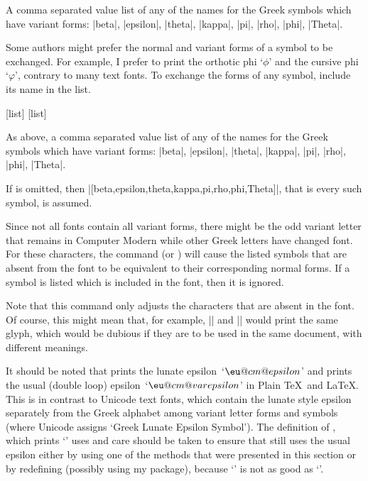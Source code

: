 \documentclass{ltxdockit}
\begin{document}
\begin{ltxsyntax}

\begin{marglist}

\item[\prm{list}] A comma separated value list of any of the names for the Greek symbols which have variant forms: |beta|, |epsilon|, |theta|, |kappa|, |pi|, |rho|, |phi|, |Theta|.

\end{marglist}

Some authors might prefer the normal and variant forms of a symbol to be exchanged. For example, I prefer  to print the orthotic phi ‘$\phi$’ and  the cursive phi ‘$\varphi$’, contrary to many text fonts. To exchange the forms of any symbol, include its name in the list.

[list]
[list]

\begin{marglist}

\item[\prm{list}] As above, a comma separated value list of any of the names for the Greek symbols which have variant forms: |beta|, |epsilon|, |theta|, |kappa|, |pi|, |rho|, |phi|, |Theta|.

If  is omitted, then |[beta,epsilon,theta,kappa,pi,rho,phi,Theta]|, that is every such symbol, is assumed.

\end{marglist}

Since not all fonts contain all variant forms, there might be the odd variant letter that remains in Computer Modern while other Greek letters have changed font. For these characters, the command  (or ) will cause the listed symbols that are absent from the font to be equivalent to their corresponding normal forms. If a symbol is listed which is included in the font, then it is ignored.

Note that this command only adjusts the characters that are absent in the font. Of course, this might mean that, for example, |\vartheta| and |\theta| would print the same glyph, which would be dubious if they are to be used in the same document, with different meanings.

\end{ltxsyntax}

\makeatletter
It should be noted that  prints the lunate epsilon~‘$\eu@cm@epsilon$’ and  prints the usual (double loop) epsilon~‘$\eu@cm@varepsilon$’ in Plain \TeX\ and \LaTeX. This is in contrast to Unicode text fonts, which contain the lunate style epsilon separately from the Greek alphabet among variant letter forms and symbols (where Unicode assigns ‘Greek Lunate Epsilon Symbol’). The definition of , which prints ‘\LaTeXe’ uses  and care should be taken to ensure that  still uses the usual epsilon either by using one of the methods that were presented in this section or by redefining  (possibly using my  package), because {\setLaTeXee{\mbox{$\varepsilon$}}‘\LaTeXe’} is not as good as {\setLaTeXee{\mbox{$\epsilon$}}‘\LaTeXe’}.
\makeatother
\end{document}
